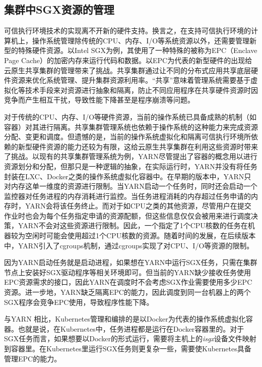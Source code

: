 \subsection{集群中SGX资源的管理}

可信执行环境技术的实现离不开新的硬件支持。换言之，在支持可信执行环境的计算机上，操作系统管理除传统的CPU、内存、I/O等系统资源以外，还需要管理新型的特殊硬件资源。以Intel SGX为例，其使用了一种特殊的被称为EPC（Enclave Page Cache）的加密内存来运行代码和数据。以EPC为代表的新型硬件的出现给云原生共享集群的管理带来了挑战。共享集群通过让不同的分布式应用共享底层硬件资源来优化系统管理、提升集群资源利用率。“共享”意味着管理系统需要基于虚拟化等技术手段来对资源进行抽象和隔离，防止不同应用程序在共享硬件资源时因竞争而产生相互干扰，导致性能下降甚至是程序崩溃等问题。

对于传统的CPU、内存、I/O等硬件资源，当前的操作系统已具备成熟的机制（如容器）对其进行隔离。共享集群管理系统也依赖于操作系统的这种能力来完成资源分配、变更和调度。但遗憾的是，当前的操作系统虚拟化和隔离可信执行环境所依赖的新型硬件资源的能力还较为有限，这给云原生共享集群在利用这些资源时带来了挑战。以现有的共享集群管理系统为例，YARN\parencite{vavilapalli2013apache}尽管提出了容器的概念用以进行资源划分和分配，但那只是一种逻辑的抽象，在实际运行时，YARN并没有将任务封装在LXC、Docker之类的操作系统虚拟化容器中。在早期的版本中，YARN只对内存这单一维度的资源进行限制。当YARN启动一个任务时，同时还会启动一个监控器对任务进程的内存消耗进行监控。当任务进程消耗的内存超过任务申请的内存时，YARN会将该任务终止。而对于如CPU之类的其他资源，尽管用户在提交作业时也会为每个任务指定申请的资源配额，但这些信息仅仅会被用来进行调度决策，YARN不会对这些资源进行限制。因此，一个指定了1个CPU核数的任务在机器较为空闲时可能会使用超过1个CPU核数的资源。随着时间的发展，在后续版本中，YARN引入了cgroups机制，通过cgroups实现了对CPU、I/O等资源的限制。

因为YARN启动任务就是启动进程，如果想在YARN中运行SGX任务，只需在集群节点上安装好SGX驱动程序等相关环境即可。但当前的YARN缺少接收任务使用EPC资源需求的接口，因此YARN在调度时不会考虑SGX作业需要使用多少EPC资源。进一步地，YARN缺乏隔离EPC的能力，因此调度到同一台机器上的两个SGX程序会竞争EPC使用，导致程序性能下降。

与YARN 相比，Kubernetes\parencite{bernstein2014containers}管理和编排的是以Docker为代表的操作系统虚拟化容器。也就是说，在Kubernetes中，任务进程都是运行在Docker容器里的。对于SGX任务而言，如果想要以Docker的形式运行，需要将主机上的\textit{isgx}设备文件映射到容器里。在Kubernetes里运行SGX任务则更复杂一些，需要使Kubernetes具备管理EPC的能力。

